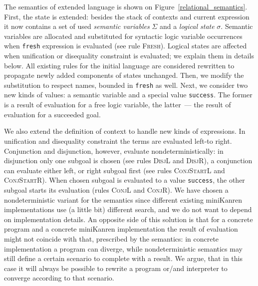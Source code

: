 The semantics of extended language is shown on Figure~\ref{relational_semantics}. First, the state is extended: besides the stack of contexts and
current expression it now contains a set of used \emph{semantic variables} $\Sigma$ and a \emph{logical state} $\sigma$. 
Semantic variables are allocated and substituted for syntactic logic variable occurrences when \lstinline|fresh| expression is evaluated 
(see rule \textsc{Fresh}). Logical states are affected when unification or disequality constraint is evaluated; we explain them
in details below. All existing rules for the initial language are considered rewritten to propagate newly added components of states unchanged.
Then, we modify the substitution to respect names, bounded in \lstinline|fresh| as well. 
Next, we consider two new kinds of values: a semantic variable and a special value \lstinline|success|. The former is a result of evaluation for
a free logic variable, the latter~--- the result of evaluation for a succeeded goal.


We also extend the definition of context to handle new kinds of expressions. In unification and disequality constraint the terms are evaluated left-to right.
Conjunction and disjunction, however, evaluate nondeterministically: in disjunction only one subgoal is chosen (see rules \textsc{DisjL} and \textsc{DisjR}),
a conjunction can evaluate either left, or right subgoal first (see rules \textsc{ConjStartL} and \textsc{ConjStartR}). When chosen subgoal is evaluated
to a value \lstinline|success|, the other subgoal starts its evaluation (rules \textsc{ConjL} and \textsc{ConjR}).
We have chosen a nondeterministic variant for the semantics since different existing miniKanren implementations use (a little bit) different search, and we do 
not want to depend on implementation details. An opposite side of this solution is that for a concrete program and a concrete miniKanren implementation 
the result of evaluation might not coincide with that, prescribed by the semantics: in concrete implementation a program can diverge, while
nondeterministic semantics may still define a certain scenario to complete with a result. We argue, that in this case it will always be possible to
rewrite a program or/and interpreter to converge according to that scenario.


